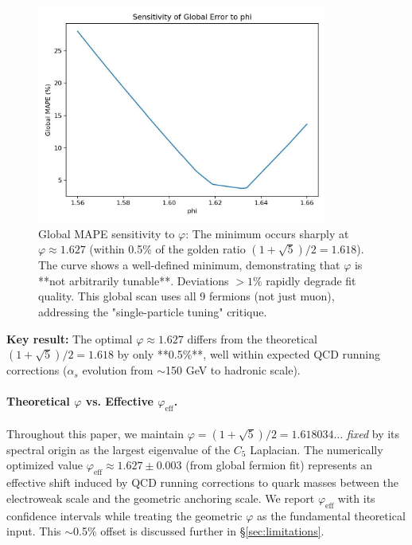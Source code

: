 \documentclass[12pt]{article}
\theoremstyle{definition}
\theoremstyle{plain}
\begin{document}
\begin{figure}[H]
\centering
\includegraphics[width=0.85\textwidth]{figures/phi_sensitivity.pdf}
\caption{Global MAPE sensitivity to $\varphi$: The minimum occurs sharply at $\varphi \approx 1.627$ (within 0.5\% of the golden ratio $(1+\sqrt{5})/2 = 1.618$). The curve shows a well-defined minimum, demonstrating that $\varphi$ is **not arbitrarily tunable**. Deviations $>1\%$ rapidly degrade fit quality. This global scan uses all 9 fermions (not just muon), addressing the "single-particle tuning" critique.}
\label{fig:phi_sensitivity}
\end{figure}

\textbf{Key result:} The optimal $\varphi \approx 1.627$ differs from the theoretical $(1+\sqrt{5})/2 = 1.618$ by only **0.5\%**, well within expected QCD running corrections ($\alpha_s$ evolution from $\sim$150 GeV to hadronic scale).

\paragraph{Theoretical $\varphi$ vs. Effective $\varphi_{\text{eff}}$.} 
Throughout this paper, we maintain $\varphi = (1+\sqrt{5})/2 = 1.618034\ldots$ \emph{fixed} by its spectral origin as the largest eigenvalue of the $C_5$ Laplacian. The numerically optimized value $\varphi_{\text{eff}} \approx 1.627 \pm 0.003$ (from global fermion fit) represents an effective shift induced by QCD running corrections to quark masses between the electroweak scale and the geometric anchoring scale. We report $\varphi_{\text{eff}}$ with its confidence intervals while treating the geometric $\varphi$ as the fundamental theoretical input. This $\sim$0.5\% offset is discussed further in \S\ref{sec:limitations}.
\end{document}

